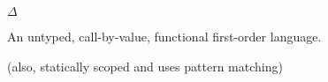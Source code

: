 \begin{frame}

\begin{center}

{\fontsize{40}{20} $\Delta$}

\vspace{0.5in}

An untyped, call-by-value, functional first-order language.

\vspace{0.2in}

\small (also, statically scoped and uses pattern matching)

\end{center}

\end{frame}

